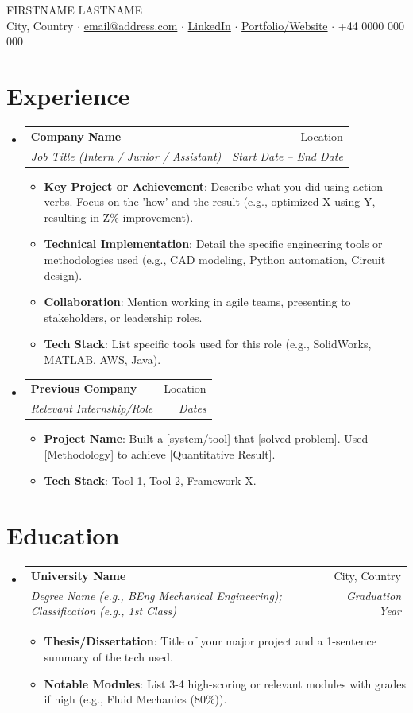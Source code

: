\documentclass[letterpaper,11pt]{article}
\makeatletter
\newcommand{\resumeItem}[2]{
  \item\small{
    \textbf{#1}{: #2 \vspace{-2pt}}
  }
}
\newcommand{\resumeSubheading}[4]{
  \vspace{-1pt}\item
    \begin{tabular*}{0.97\textwidth}{l@{\extracolsep{\fill}}r}
      \textbf{#1} & #2 \\
      \textit{\small#3} & \textit{\small #4} \\
    \end{tabular*}\vspace{-5pt}
}
\newcommand{\resumeSubHeadingListStart}{\begin{itemize}[leftmargin=*]}
\newcommand{\resumeSubHeadingListEnd}{\end{itemize}}
\newcommand{\resumeItemListStart}{\begin{itemize}}
\newcommand{\resumeItemListEnd}{\end{itemize}\vspace{-5pt}}
\makeatother
\begin{document}
\begin{center}
    {\huge \scshape FIRSTNAME LASTNAME}\\[4pt]
    City, Country $\cdot$ \href{mailto:email@address.com}{email@address.com} $\cdot$
    \href{https://linkedin.com/in/username}{LinkedIn} $\cdot$
    \href{https://yourportfolio.com}{Portfolio/Website} $\cdot$
    +44 0000 000 000
\end{center}

\section{Experience}
  \resumeSubHeadingListStart

    \resumeSubheading
    {Company Name}{Location}
    {Job Title (Intern / Junior / Assistant)}{Start Date -- End Date}
    \resumeItemListStart
        \resumeItem{Key Project or Achievement}
        {Describe what you did using action verbs. Focus on the 'how' and the result (e.g., optimized X using Y, resulting in Z\% improvement).}
        \resumeItem{Technical Implementation}
        {Detail the specific engineering tools or methodologies used (e.g., CAD modeling, Python automation, Circuit design).}
        \resumeItem{Collaboration}
        {Mention working in agile teams, presenting to stakeholders, or leadership roles.}
        \resumeItem{Tech Stack}
        {List specific tools used for this role (e.g., SolidWorks, MATLAB, AWS, Java).}
    \resumeItemListEnd

    \resumeSubheading
      {Previous Company}{Location}
      {Relevant Internship/Role}{Dates}
      \resumeItemListStart
        \resumeItem{Project Name}
          {Built a [system/tool] that [solved problem]. Used [Methodology] to achieve [Quantitative Result].}
        \resumeItem{Tech Stack}
        {Tool 1, Tool 2, Framework X.}
      \resumeItemListEnd

  \resumeSubHeadingListEnd

\section{Education}
  \resumeSubHeadingListStart
    \resumeSubheading
      {University Name}{City, Country}
      {Degree Name (e.g., BEng Mechanical Engineering); Classification (e.g., 1st Class)}{Graduation Year}
      \resumeItemListStart
          \resumeItem{Thesis/Dissertation}{Title of your major project and a 1-sentence summary of the tech used.}
          \resumeItem{Notable Modules}{List 3-4 high-scoring or relevant modules with grades if high (e.g., Fluid Mechanics (80\%)).}
      \resumeItemListEnd
  \resumeSubHeadingListEnd
\end{document}
